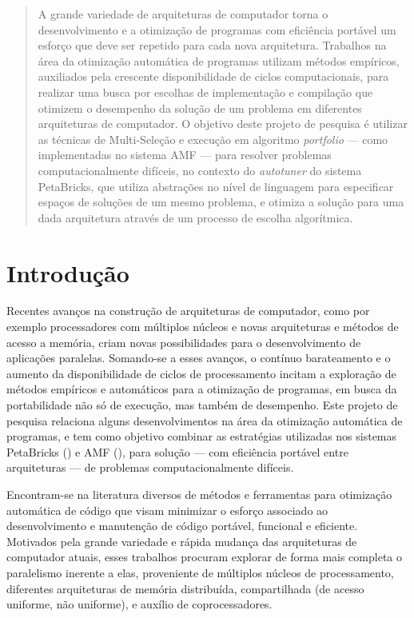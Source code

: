 \documentclass[a4paper, 11pt]{article}
\begin{document}
\begin{abstract}
    
A grande variedade de arquiteturas de computador torna o desenvolvimento e a 
otimização de programas com eficiência portável um esforço que deve ser 
repetido para cada nova arquitetura. Trabalhos na área da otimização automática
de programas utilizam métodos empíricos, auxiliados pela crescente
disponibilidade de ciclos computacionais, para realizar uma busca por escolhas
de implementação e compilação que otimizem o desempenho da solução de um 
problema em diferentes arquiteturas de computador. O objetivo deste projeto de
pesquisa é utilizar as técnicas de Multi-Seleção e execução em algoritmo 
\emph{portfolio} --- como implementadas no sistema AMF --- para resolver 
problemas computacionalmente difíceis, no contexto do \emph{autotuner} do 
sistema PetaBricks, que utiliza abstrações no nível de linguagem para 
especificar espaços de soluções de um mesmo problema, e otimiza a solução para 
uma dada arquitetura através de um processo de escolha algorítmica.

\end{abstract}

\section{Introdução}

Recentes avanços na construção de arquiteturas de computador, como
por exemplo processadores com múltiplos núcleos e novas arquiteturas
e métodos de acesso a memória, criam novas possibilidades para o 
desenvolvimento de aplicações paralelas. Somando-se a esses avanços, o contínuo
barateamento e o aumento da disponibilidade de ciclos de processamento incitam 
a exploração de métodos empíricos e automáticos para a otimização de programas,
em busca da portabilidade não só de execução, mas também de desempenho. Este 
projeto de pesquisa relaciona alguns desenvolvimentos na área da otimização
automática de programas, e tem como objetivo combinar as estratégias utilizadas
nos sistemas PetaBricks (\citet{ansel2014phd}) e AMF 
(\citet{goldman2012framework}), para solução --- com eficiência portável entre
arquiteturas --- de problemas computacionalmente difíceis.

Encontram-se na literatura diversos de métodos e ferramentas para otimização 
automática de código que visam minimizar o esforço associado ao desenvolvimento
e manutenção de código portável, funcional e eficiente. Motivados pela grande
variedade e rápida mudança das arquiteturas de computador atuais, esses 
trabalhos procuram explorar de forma mais completa o paralelismo inerente a
elas, proveniente de múltiplos núcleos de processamento, 
diferentes arquiteturas de memória distribuída, compartilhada (de acesso 
uniforme, não uniforme), e auxílio de coprocessadores.
\end{document}
